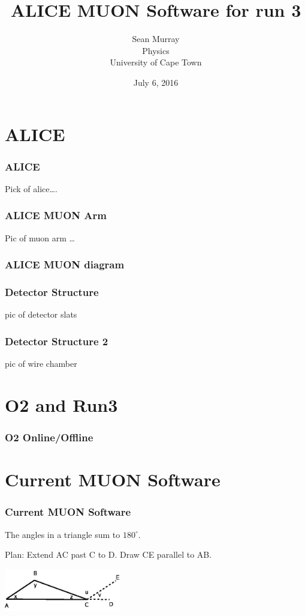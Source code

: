 \documentclass{beamer}
\title{ALICE MUON Software for run 3}
\author{Sean Murray \\
    Physics \\
    University of Cape Town 
}
\date{July 6, 2016}
\begin{document}
\begin{frame}
\titlepage
\end{frame}

\section{ALICE}

\begin{frame}
\frametitle{ALICE}
Pick of alice\ldots.
\end{frame}

\begin{frame}
\frametitle{ALICE MUON Arm}
Pic of muon arm \ldots
\end{frame}

\begin{frame}
  \frametitle{ALICE MUON diagram}


\end{frame}

\begin{frame}
\frametitle{Detector Structure}
pic of detector slats 

\end{frame}

\begin{frame}
\frametitle{Detector Structure 2}
pic of wire chamber 

\end{frame}

\section{O2 and Run3}
\begin{frame}
\frametitle{O2 Online/Offline}


\end{frame}

\section{Current MUON Software}

\begin{frame}
\frametitle{Current MUON Software}


\begin{theorem}
The angles in a triangle sum to $180^{\circ}$.
\end{theorem}

\pause

Plan:  Extend AC past C to D.  Draw CE parallel to AB.

\includegraphics[width = 2.0in]{BeamerTriangle.jpg}  

\end{frame}
\end{document}
